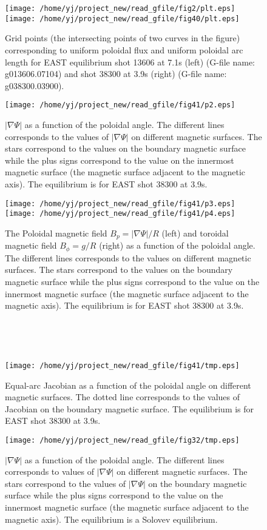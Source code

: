 \documentclass{article}
\begin{document}
\begin{figure}[h]
  \texttt{[image: /home/yj/project\_new/read\_gfile/fig2/plt.eps]}\texttt{[image: /home/yj/project\_new/read\_gfile/fig40/plt.eps]}
  \caption{Grid points (the intersecting points of two curves in the figure)
  corresponding to uniform poloidal flux and uniform poloidal arc length for
  EAST equilibrium shot 13606 at 7.1s (left) (G-file name: g013606.07104) and
  shot 38300 at 3.9s (right) (G-file name: g038300.03900).}
\end{figure}

\begin{figure}[h]
  \texttt{[image: /home/yj/project\_new/read\_gfile/fig41/p2.eps]}
  \caption{$| \nabla \Psi |$ as a function of the poloidal angle. The
  different lines corresponds to the values of $| \nabla \Psi |$ on different
  magnetic surfaces. The stars correspond to the values on the boundary
  magnetic surface while the plus signs correspond to the value on the
  innermost magnetic surface (the magnetic surface adjacent to the magnetic
  axis). The equilibrium is for EAST shot 38300 at 3.9s.}
\end{figure}

\begin{figure}[h]
  \texttt{[image: /home/yj/project\_new/read\_gfile/fig41/p3.eps]}\texttt{[image: /home/yj/project\_new/read\_gfile/fig41/p4.eps]}
  \caption{The Poloidal magnetic field $B_p = | \nabla \Psi | / R$ (left) and
  toroidal magnetic field $B_{\phi} = g / R$ (right) as a function of the
  poloidal angle. The different lines corresponds to the values on different
  magnetic surfaces. The stars correspond to the values on the boundary
  magnetic surface while the plus signs correspond to the value on the
  innermost magnetic surface (the magnetic surface adjacent to the magnetic
  axis). The equilibrium is for EAST shot 38300 at 3.9s.}
\end{figure}

\

\

\begin{figure}[h]
  \texttt{[image: /home/yj/project\_new/read\_gfile/fig41/tmp.eps]}
  \caption{Equal-arc Jacobian as a function of the poloidal angle on different
  magnetic surfaces. The dotted line corresponds to the values of Jacobian on
  the boundary magnetic surface. The equilibrium is for EAST shot 38300 at
  3.9s.}
\end{figure}

\begin{figure}[h]
  \texttt{[image: /home/yj/project\_new/read\_gfile/fig32/tmp.eps]}
  \caption{$| \nabla \Psi |$ as a function of the poloidal angle. The
  different lines corresponds to values of $| \nabla \Psi |$ on different
  magnetic surfaces. The stars correspond to the values of $| \nabla \Psi |$
  on the boundary magnetic surface while the plus signs correspond to the
  value on the innermost magnetic surface (the magnetic surface adjacent to
  the magnetic axis). The equilibrium is a Solovev equilibrium.}
\end{figure}
\end{document}

